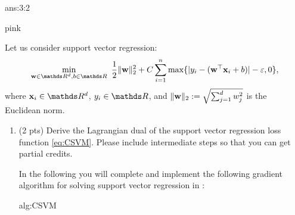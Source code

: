 \documentclass{tron}
\newcommand{\mref}[1]{\underline{\textbf{\hypersetup{linkcolor=orange}\Cref{#1}\hypersetup{linkcolor=blue}}}}
\begin{document}
\begin{answer}[Conclustion]{ans:3:2}
\begin{note}{pink}{}


	\end{note}
\end{answer}


\newpage
\setcounter{section}{4}
\begin{exercise}{}
Let us consider support vector regression:
\begin{align}
\label{eq:CSVM}
\min_{\wv\in \RR^d, 
b\in\RR}  ~ \frac{1}{2} \|\wv\|_2^2 + C\sum_{i=1}^n \max\{ | y_i -  (\wv^\top \xv_i + b)| -\varepsilon , 0 \},
\end{align}
where $\xv_i \in \RR^d$, $y_i \in \RR$, and $\|\mathbf{w}\|_2 := \sqrt{\sum_{j=1}^d w_j^2}$ is the Euclidean norm.

\begin{enumerate}
	
\item (2 pts) Derive the Lagrangian dual of the support vector regression loss function \eqref{eq:CSVM}. Please include intermediate steps so that you can get partial credits.

\ans{\mref{ans:4:1}} 


\vskip1cm

In the following you will complete and implement the following gradient algorithm for solving support vector regression in :

\begin{algo}{alg:CSVM}
	\DontPrintSemicolon
	
	
\end{algo}
\end{enumerate}
\end{exercise}
\end{document}
